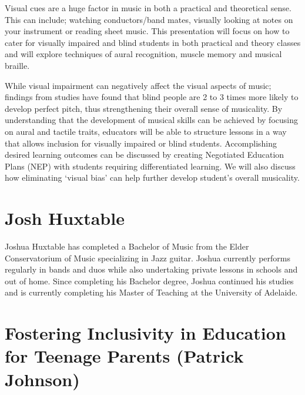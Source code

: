 \documentclass[twoside,12pt,a4paper,notitlepage]{memoir}
\begin{document}
Visual cues are a huge factor in music in both a practical and theoretical sense. This can include; watching conductors/band mates, visually looking at notes on your instrument or reading sheet music. This presentation will focus on how to cater for visually impaired and blind students in both practical and theory classes and will explore techniques of aural recognition, muscle memory and musical braille.


While visual impairment can negatively affect the visual aspects of music; findings from studies have found that blind people are 2 to 3 times more likely to develop perfect pitch, thus strengthening their overall sense of musicality. By understanding that the development of musical skills can be achieved by focusing on aural and tactile traits, educators will be able to structure lessons in a way that allows inclusion for visually impaired or blind students. Accomplishing desired learning outcomes can be discussed by creating Negotiated Education Plans (NEP) with students requiring differentiated learning. We will also discuss how eliminating ‘visual bias’ can help further develop student’s overall musicality.

\section*{Josh Huxtable}

Joshua Huxtable has completed a Bachelor of Music from the Elder Conservatorium of Music specializing in Jazz guitar. Joshua currently performs regularly in bands and duos while also undertaking private lessons in schools and out of home. Since completing his Bachelor degree, Joshua continued his studies and is currently completing his Master of Teaching at the University of Adelaide.



\pagebreak
\section*{Fostering Inclusivity in Education for Teenage Parents (Patrick Johnson)}
\label{aut:johnson}
\end{document}
